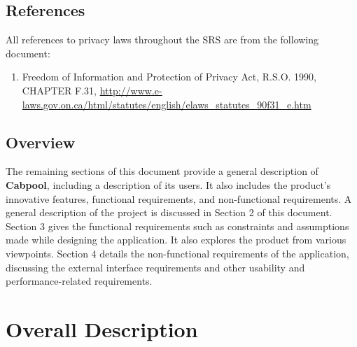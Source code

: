 \documentclass[english]{article}
\begin{document}
\subsection{References}
\label{sub:references}
All references to privacy laws throughout the SRS are from the following document:
\begin{enumerate}
	\item Freedom of Information and Protection of Privacy Act, R.S.O. 1990, CHAPTER F.31, \url{http://www.e-laws.gov.on.ca/html/statutes/english/elaws_statutes_90f31_e.htm}
\end{enumerate}


\subsection{Overview}
\label{sub:overview}
The remaining sections of this document provide a general description of \textbf{Cabpool}, including a description of its users. It also includes the product's innovative features, functional requirements, and non-functional requirements. A general description of the project is discussed in Section 2 of this document. Section 3 gives the functional requirements such as constraints and assumptions made while designing the application. It also explores the product from various viewpoints. Section 4 details the non-functional requirements of the application, discussing the external interface requirements and other usability and performance-related requirements.


\section{Overall Description}
\label{sec:overall_description}
\end{document}
